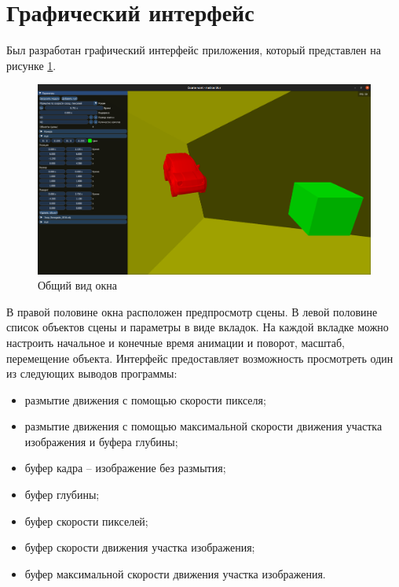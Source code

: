 



\section{Графический интерфейс}

Был разработан графический интерфейс приложения, который представлен на рисунке \ref{fig:gui_window}. 

\begin{figure}[h]
    \centering
    \includegraphics[width=0.9\columnwidth]{img/gui/common_new.png}
    \caption{Общий вид окна}
    \label{fig:gui_window}
\end{figure}


В правой половине окна расположен предпросмотр сцены. В левой половине список объектов сцены и параметры в виде вкладок. На каждой вкладке можно настроить начальное и конечные время анимации и поворот, масштаб, перемещение объекта.
Интерфейс предоставляет возможность просмотреть один из следующих выводов программы:
\begin{itemize}
    \item размытие движения с помощью скорости пикселя;
    \item размытие движения с помощью максимальной скорости
    движения участка изображения и буфера глубины;
    \item буфер кадра -- изображение без размытия;
    \item буфер глубины;
    \item буфер скорости пикселей;
    \item буфер скорости движения участка изображения;
    \item буфер максимальной скорости движения участка изображения.
\end{itemize}

